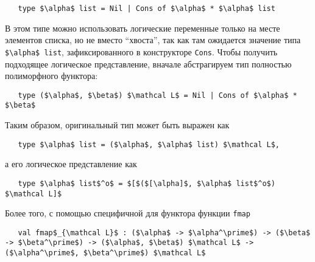 
\begin{lstlisting}
   type $\alpha$ list = Nil | Cons of $\alpha$ * $\alpha$ list
\end{lstlisting}

В этом типе можно использовать логические переменные только на месте элементов списка, но не вместо \enquote{хвоста}, так как там ожидается значение типа \lstinline|$\alpha$ list|, зафиксированного в конструкторе  \lstinline|Cons|.
Чтобы получить подходящее логическое представление, вначале абстрагируем тип полностью полиморфного функтора:


\begin{lstlisting}
   type ($\alpha$, $\beta$) $\mathcal L$ = Nil | Cons of $\alpha$ * $\beta$
\end{lstlisting}

\noindent Таким образом, оригинальный тип может быть выражен как


\begin{lstlisting}
   type $\alpha$ list = ($\alpha$, $\alpha$ list) $\mathcal L$,
\end{lstlisting}

\noindent а его логическое представление как

\begin{lstlisting}
   type $\alpha$ list$^o$ = $[$($[\alpha]$, $\alpha$ list$^o$) $\mathcal L]$
\end{lstlisting}

Более того, с помощью специфичной для функтора функции \lstinline=fmap=

\begin{lstlisting}
   val fmap$_{\mathcal L}$ : ($\alpha$ -> $\alpha^\prime$) -> ($\beta$ -> $\beta^\prime$) -> ($\alpha$, $\beta$) $\mathcal L$ -> ($\alpha^\prime$, $\beta^\prime$) $\mathcal L$
\end{lstlisting}

